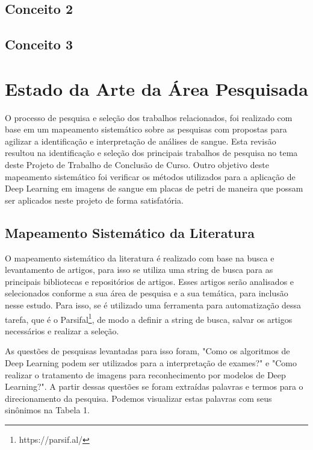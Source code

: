 \section{Conceito 2}
\label{sec:conceito2}

\section{Conceito 3}
\label{sec:conceito3}

\chapter{Estado da Arte da Área Pesquisada}
\label{chap:mapeamento}

O processo de pesquisa e seleção dos trabalhos relacionados, foi realizado com base em um mapeamento sistemático sobre as pesquisas com propostas para agilizar a identificação e interpretação de análises de sangue. Esta revisão resultou na identificação e seleção dos principais trabalhos de pesquisa no tema deste Projeto de Trabalho de Conclusão de Curso. Outro objetivo deste mapeamento sistemático foi verificar os métodos utilizados para a aplicação de Deep Learning em imagens de sangue em placas de petri de maneira que possam ser aplicados neste projeto de forma satisfatória.

\section{Mapeamento Sistemático da Literatura}

O mapeamento sistemático da literatura é realizado com base na busca e levantamento de artigos, para isso se utiliza uma string de busca para as principais bibliotecas e repositórios de artigos. Esses artigos serão analisados e selecionados conforme a sua área de pesquisa e a sua temática, para inclusão nesse estudo. Para isso, se é utilizado uma ferramenta para automatização dessa tarefa, que é o Parsifal\footnote[1]{https://parsif.al/}, de modo a definir a string de busca, salvar os artigos necessários e realizar a seleção.

As questões de pesquisas levantadas para isso foram, "Como os algoritmos de Deep Learning podem ser utilizados para a interpretação de exames?" e "Como realizar o tratamento de imagens para reconhecimento por modelos de Deep Learning?". A partir dessas questões se foram extraídas palavras e termos para o direcionamento da pesquisa. Podemos visualizar estas palavras com seus sinônimos na Tabela 1.

